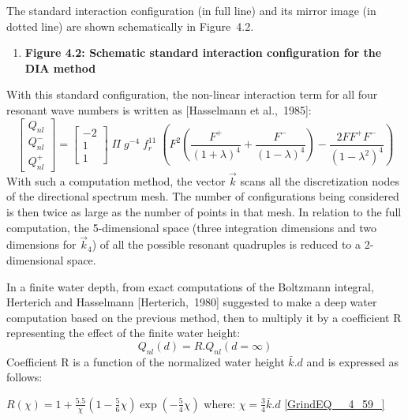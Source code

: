  The standard interaction configuration (in full line) and its mirror image (in dotted line) are shown schematically in Figure~4.2.



\begin{enumerate}
\item  \textbf{Figure 4.2: Schematic standard interaction configuration for the DIA method}
\end{enumerate}

With this standard configuration, the non-linear interaction term for all four resonant wave numbers is written as [Hasselmann et al.,~1985]:
\begin{equation} \label{GrindEQ__4_57_}
\left[\begin{array}{c} {Q_{nl}^{} } \\ {Q_{nl}^{-} } \\ {Q_{nl}^{+} } \end{array}\right]=\left[\begin{array}{c} {-2} \\ {1} \\ {1} \end{array}\right]\; \Pi \; g^{-4} \; f_{r}^{11} \; \left(F^{2} \left(\frac{F^{+} }{\left(1+\lambda \right)^{4} } +\frac{F^{-} }{\left(1-\lambda \right)^{4} } \right)-\frac{2FF^{+} F^{-} }{\left(1-\lambda ^{2} \right)^{4} } \right)
\end{equation}
With such a computation method, the vector $\vec{k}$ scans all the discretization nodes of the directional spectrum mesh. The number of configurations being considered is then twice as large as the number of points in that mesh. In relation to the full computation, the 5-dimensional space (three integration dimensions and two dimensions for $\vec{k}_{4} $) of all the possible resonant quadruples is reduced to a 2-dimensional space.

 In a finite water depth, from exact computations of the Boltzmann integral, Herterich and Hasselmann [Herterich,~1980] suggested to make a deep water computation based on the previous method, then to multiply it by a coefficient R representing the effect of the finite water height:
\begin{equation} \label{GrindEQ__4_58_}
Q_{nl} (d)=R.Q_{nl} (d=\infty )
\end{equation}
Coefficient R is a function of the normalized water height $\bar{k}.d$ and is expressed as follows:

$R(\chi )=1+\frac{5.5}{\chi } (1-\frac{5}{6} \chi )\exp \left(-\frac{5}{4} \chi \right)$  where: $\chi =\frac{3}{4} \bar{k}.d$ \eqref{GrindEQ__4_59_}


